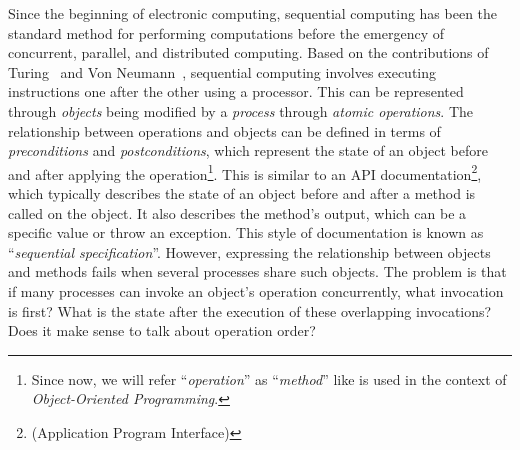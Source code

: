Since the beginning of electronic computing, sequential computing has been the standard method for performing computations before the emergency of concurrent, parallel, and distributed computing. Based on the contributions of  Turing~\cite{DBLP_journals_x_Turing37} and Von Neumann~\cite{DBLP_journals_annals_Neumann93}, sequential computing involves executing instructions one after the other using a processor. This can be represented through \textit{objects} being modified by a \textit{process} through \textit{atomic operations}. The relationship between operations and objects can be defined in terms of \textit{preconditions} and \textit{postconditions}, which represent the state of an object before and after applying the operation\footnote{Since now, we will refer ``\textit{operation}'' as ``\textit{method}'' like is used in the context of \textit{Object-Oriented Programming}.}. This is similar to an API documentation\footnote{(Application Program Interface)},  which typically describes the state of an object before and after a method is called on the object. It also describes the method's output, which can be a specific value or throw an exception. This style of documentation is known as ``\textit{sequential specification}''.
However, expressing the relationship between objects and methods fails when several processes share such objects. The problem is that if many processes can invoke an object's operation concurrently, what invocation is first? What is the state after the execution of these overlapping invocations? Does it make sense to talk about operation order?


